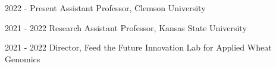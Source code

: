 
\begin{cvskills}

  \cvskill
    {2022 - Present} %
    {Assistant Professor, Clemson University} %

  \cvskill
    {2021 - 2022} %
    {Research Assistant Professor, Kansas State University} %

  \cvskill
    {2021 - 2022} %
    {Director, Feed the Future Innovation Lab for Applied Wheat Genomics} %

\end{cvskills}